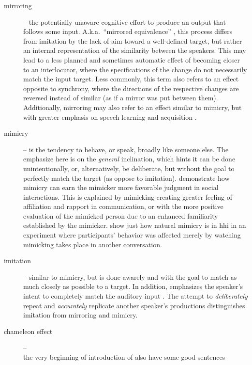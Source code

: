 \begin{description}
	\item[mirroring] -- the potentially unaware cognitive effort to produce an output that follows some input.
	A.k.a.\ \enquote{mirrored equivalence} \citep{Messum2015creating, Messum2007mirroring}, this process differs from imitation by the lack of aim toward a well-defined target, but rather an internal representation of the similarity between the speakers.
	This may lead to a less planned and sometimes automatic effect of becoming closer to an interlocutor, where the specifications of the change do not necessarily match the input target.
	Less commonly, this term also refers to an effect opposite to synchrony, where the directions of the respective changes are reversed instead of similar (as if a mirror was put between them).
	Additionally, mirroring may also refer to an effect similar to mimicry, but with greater emphasis on speech learning and acquisition \citep[e.g.,][]{Yoshikawa2003constructivist}.
	
	\item[mimicry] -- is the tendency to behave, or speak, broadly like someone else.
	The emphasize here is on the \emph{general} inclination, which hints it can be done unintentionally, or, alternatively, be deliberate, but without the goal to perfectly match the target (as oppose to imitation).
	\citet{Gueguen2009mimicry} demonstrate how mimicry can earn the mimicker more favorable judgment in social interactions.
	This is explained by mimicking creating greater feeling of affiliation and rapport in communication, or with the more positive evaluation of the mimicked person due to an enhanced familiarity established by the mimicker.
	\citet{Parrill2006seeing} show just how natural mimicry is in \ac{hhi} in an experiment where participants' behavior was affected merely by watching mimicking takes place in another conversation.
	
	\item[imitation] -- similar to mimicry, but is done awarely and with the goal to match as much closely as possible to a target.
	In addition, emphasizes the speaker's intent to completely match the auditory input \citep[cf.][]{Gueguen2009mimicry}.
	The attempt to \emph{deliberately} repeat and \emph{accurately} replicate another speaker's productions distinguishes imitation from mirroring and mimicry.
	
	\item[chameleon effect] -- \citep{Chartrand1999chameleon}\\the very beginning of introduction of \citet{Gueguen2009mimicry} also have some good sentences
	

\end{description}
